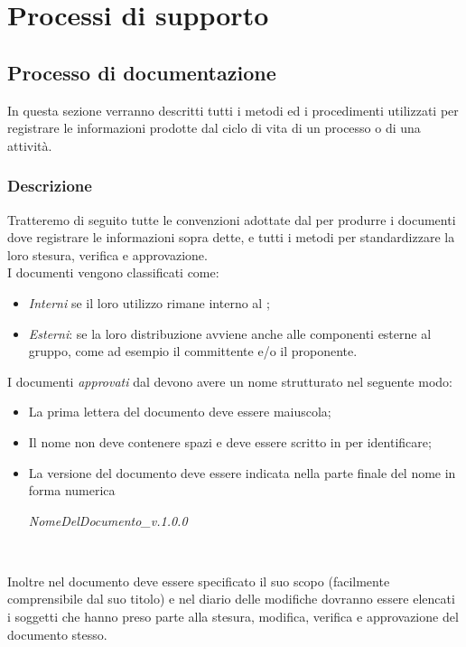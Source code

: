 \section{Processi di supporto}
\subsection{Processo di documentazione}
In questa sezione verranno descritti tutti i metodi ed i procedimenti utilizzati per registrare le informazioni prodotte dal ciclo di vita di un processo o di una attività.

\subsubsection{Descrizione}
Tratteremo di seguito tutte le convenzioni adottate dal  per produrre i documenti dove registrare le informazioni sopra dette, e tutti i metodi per standardizzare la loro  stesura, verifica e approvazione. \\
I documenti vengono classificati come:
\begin{itemize}
  \item \textit{Interni} se il loro utilizzo rimane interno al ;
  \item \textit{Esterni}: se la loro distribuzione avviene anche alle componenti esterne al gruppo, come ad esempio il committente e/o il proponente.
\end{itemize}

I documenti \textit{approvati} dal \textit{\Pm} devono avere un nome strutturato nel seguente modo:
\begin{itemize}
  \item La prima lettera del documento deve essere maiuscola;
  \item Il nome non deve contenere spazi e deve essere scritto in  per identificare; 
  \item La versione del documento deve essere indicata nella parte finale del nome in forma numerica
  \begin{center}
  \textit{NomeDelDocumento\_v.1.0.0}
  \end{center}\
\end{itemize}
Inoltre nel documento deve essere specificato il suo scopo (facilmente comprensibile dal suo titolo) e  nel diario delle modifiche dovranno essere elencati i soggetti che hanno preso parte alla stesura, modifica, verifica e approvazione del documento stesso.

